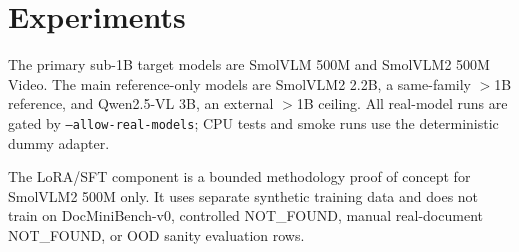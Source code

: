 \section{Experiments}

The primary sub-1B target models are SmolVLM 500M and SmolVLM2 500M Video. The
main reference-only models are SmolVLM2 2.2B, a same-family $>$1B reference, and
Qwen2.5-VL 3B, an external $>$1B ceiling. All real-model runs are gated by
\texttt{--allow-real-models}; CPU tests and smoke runs use the deterministic
dummy adapter.

The LoRA/SFT component is a bounded methodology proof of concept for SmolVLM2
500M only. It uses separate synthetic training data and does not train on
DocMiniBench-v0, controlled NOT\_FOUND, manual real-document NOT\_FOUND, or OOD
sanity evaluation rows.




